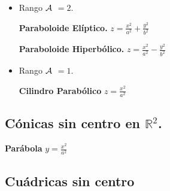 \documentclass[11pt, a4paper, titlepage]{article}
\theoremstyle{theorem-style}
\theoremstyle{definition-style}
\theoremstyle{remark-style}
\theoremstyle{example-style}
\begin{document}
\begin{itemize}

\item {Rango $\cal A$ $=2$.}



{\bf Paraboloide El\'iptico.}    \hspace{2.7cm}   $z = \frac{x^2}{a^2} + \frac{y^2}{b^2}$

\vspace{.2cm}

{\bf Paraboloide Hiperb\'olico.}    \hspace{2cm}   $z = \frac{x^2}{a^2} - \frac{y^2}{b^2}$



\vspace{0.5cm}

\item {Rango $\cal A$ $=1$.}


{\bf Cilindro Parab\'olico}    \hspace{3.3cm}   $z = \frac{x^2}{a^2}$ 

\end{itemize}

\subsection{\bf C\'onicas sin centro en $\mathbb{R}^2$.}



{\bf Par\'abola} \hspace{5.5cm}  $y = \frac{x^2}{a^2}$



\subsection{Cuádricas sin centro}
\end{document}
